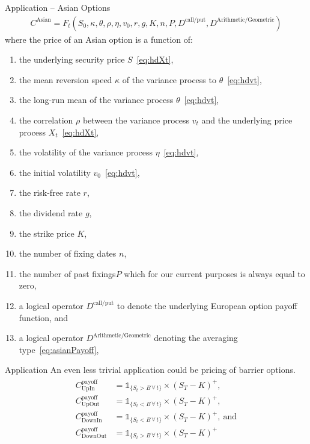 \documentclass[aspectratio=169,xcolor=dvipsnames]{beamer}
\begin{document}
		\begin{frame}{Application -- Asian Options}
			\begin{align}
				C^{\text{Asian}} = F_{t}(S_0, \kappa, \theta, \rho, \eta, v_{0}, r, g, K, n, P, D^{\text{call/put}}, D^{\text{Arithmetic/Geometric}}) \label{eq:Casian}
			\end{align}
			where the price of an Asian option is a function of:
			\begin{enumerate}
				\small
				\item the underlying security price $S$~\eqref{eq:hdXt}, 
				\item the mean reversion speed $\kappa$ of the variance process to $\theta$~\eqref{eq:hdvt}, 
				\item the long-run mean of the variance process $\theta$~\eqref{eq:hdvt}, 
				\item the correlation $\rho$ between the variance process $v_t$ and the underlying price process $X_t$~\eqref{eq:hdXt}, 
				\item the volatility of the variance process $\eta$~\eqref{eq:hdvt}, 
				\item the initial volatility $v_{0}$~\eqref{eq:hdvt}, 
				\item the risk-free rate $r$, 
				\item the dividend rate $g$, 
				\item the strike price $K$, 
				\item the number of fixing dates $n$, 
				\item the number of past fixings$P$ which for our current purposes is always equal to zero, 
				\item a logical operator $D^{\text{call/put}}$ to denote the underlying European option payoff function, and
				\item a logical operator $D^{\text{Arithmetic/Geometric}}$ denoting the averaging type~\eqref{eq:asianPayoff},
			\end{enumerate}
		\end{frame}
		
		\begin{frame}{Application}
		An even less trivial application could be pricing of barrier options.
			\begin{align}
				\begin{aligned}
					C^{\text{payoff}}_{\text{UpIn}} &= \mathbb{1}_{\{ S_t > B \,\forall\, t \}} \times (S_{T}-K)^{+}, \\
					C^{\text{payoff}}_{\text{UpOut}} &= \mathbb{1}_{\{ S_t < B \,\forall\, t \}} \times (S_{T}-K)^{+}, \\
					C^{\text{payoff}}_{\text{DownIn}} &= \mathbb{1}_{\{ S_t < B \,\forall\, t \}} \times (S_{T}-K)^{+}, \: \text{and} \\
					C^{\text{payoff}}_{\text{DownOut}} &= \mathbb{1}_{\{ S_t > B \,\forall\, t \}} \times (S_{T}-K)^{+}
				\end{aligned}
				\label{eq:BarrierPayoffs}
			\end{align}
		\end{frame}
		
\end{document}
